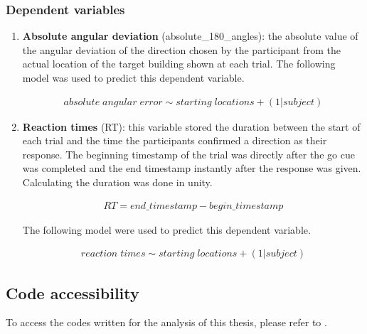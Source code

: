 \subsubsection{Dependent variables}

\begin{enumerate}
	\item \textbf{Absolute angular deviation} {\emphasize (absolute\_180\_angles)}: the absolute value of the angular deviation of the direction chosen by the participant from the actual location of the target building shown at each trial. The following model was used to predict this dependent variable. 
	
	\begin{align*}
		absolute \; angular \; error \sim starting \; locations + (1 | subject)
	\end{align*}
	

	\item \textbf{Reaction times} {\emphasize (RT)}: this variable stored the duration between the start of each trial and the time the participants confirmed a direction as their response. The beginning timestamp of the trial was directly after the go cue was completed and the end timestamp instantly after the response was given. Calculating the duration was done in unity. 
	
	\begin{align*}
		RT = end\_timestamp - begin\_timestamp
	\end{align*}

	 The following model were used to predict this dependent variable.
	 
	 \begin{align*}
	 	reaction \; times \sim starting \; locations + (1 | subject)
	 \end{align*}
 
\end{enumerate}


\subsection{Code accessibility}

To access the codes written for the analysis of this thesis, please refer to \textcite{Maleki_The_effect_of_2022}.

